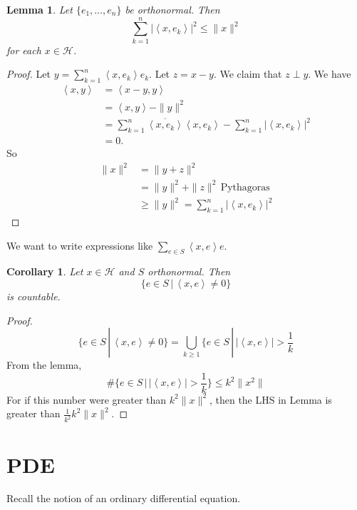 \documentclass[12pt, oneside, a4paper]{article}
\newtheorem{lem}[thm]{Lemma}
\newtheorem{cor}[thm]{Corollary}
\theoremstyle{dfn}
\newcommand{\Hil}{\mathcal{H}}
\newcommand{\iprod}[1]{\left\langle #1 \right\rangle}
\newcommand{\sumkn}{\sum_{k=1}^n}
\begin{document}
\begin{lem}
    Let $\{ e_1, \dots, e_n \}$ be orthonormal. Then \[
        \sumkn | \iprod{x, e_k} |^2 \leq \|x\|^2 
    \] for each $x \in \Hil$.  
\end{lem}
\begin{proof}
    Let $y = \sumkn \iprod{x, e_k} e_k$.  Let $z = x-y$.  We claim that $z \perp y$.  We have 
    \begin{align*}
        \iprod{x,y} &= \iprod{x-y, y} \\
                    &= \iprod{x,y} - \| y \|^2 \\
                    &= \sumkn \overline{\iprod{x,e_k}} \iprod{x, e_k} - \sumkn | \iprod {x, e_k} |^2 \\
                    &= 0.
    \end{align*}
    So \begin{align*}
        \| x \|^2   &= \|y + z \|^2 \\
                    &= \| y \|^2 + \| z \|^2 \, \text{Pythagoras} \\
                    &\geq \|y \|^2 = \sumkn | \iprod{x, e_k} |^2
    \end{align*} 
\end{proof}

We want to write expressions like $\sum_{e \in S} \iprod{x, e} e$.
\begin{cor}
    Let $x \in \Hil$ and $S$ orthonormal.  Then \[
        \{ e \in S \, | \, \iprod{x, e} \neq 0 \}
    \] is countable.  
\end{cor}

\begin{proof}
    \[
        \{ e \in S \, | \, \iprod{x, e} \neq 0 \} = \bigcup_{k \geq 1} \{ e \in S \, | \, |\iprod{x, e} | > \frac{1}{k}
    \] From the lemma, \[
        \# \{ e \in S \, | \, | \iprod{x,e} | > \frac{1}{k} \} \leq k^2 \| x ^2 \|
    \] For if this number were greater than $k^2 \| x \|^2$, then the LHS in Lemma is greater than $\frac{1}{k^2}k^2 \| x \|^2$.  
\end{proof} 


















\section{PDE}
\label{PDENotes}
Recall the notion of an ordinary differential equation.
\end{document}
